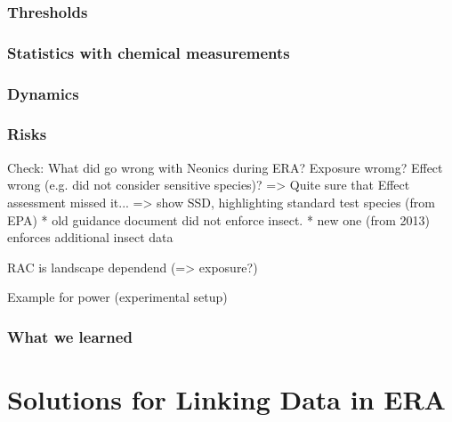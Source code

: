 \documentclass[10pt
	]{beamer}
\begin{document}
\begin{frame}
\frametitle{Thresholds}

\end{frame}

\begin{frame}
\frametitle{Statistics with chemical measurements}

\end{frame}


\begin{frame}
\frametitle{Dynamics}

\end{frame}


\begin{frame}
\frametitle{Risks}
Check: What did go wrong with Neonics during ERA?
Exposure wromg? Effect wrong (e.g. did not consider sensitive species)?
=> Quite sure that Effect assessment missed it...
=> show SSD, highlighting standard test species (from EPA)
* old guidance document did not enforce insect.
* new one (from 2013) enforces additional insect data

RAC is landscape dependend (=> exposure?)

Example for power (experimental setup)

\end{frame}


\begin{frame}
\frametitle{What we learned}

\end{frame}

\section{Solutions for Linking Data in ERA}
\end{document}
